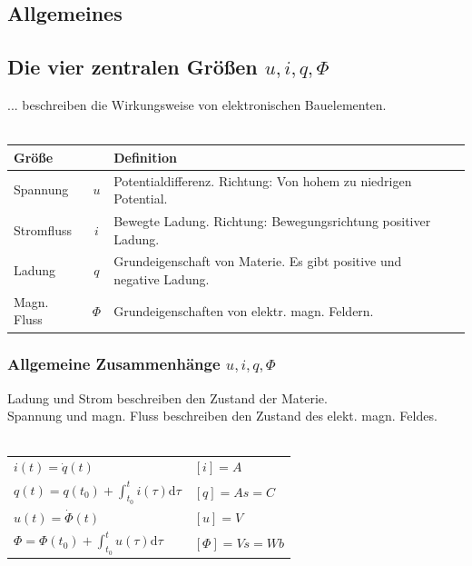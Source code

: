 \documentclass[fs, footer]{latex4ei}
\begin{document}
\begin{multicols*}{4}

\section{Allgemeines}
	
	\subsection{Die vier zentralen Größen $u,i,q,\Phi$}
	... beschreiben die Wirkungsweise von elektronischen Bauelementen.\\ \\
	\begin{tabular}{lc|ll}
		Größe & & Definition\\ \hline
		Spannung & $u$ & Potentialdifferenz. Richtung: Von hohem zu niedrigen Potential.\\
		Stromfluss & $i$ & Bewegte Ladung. Richtung: Bewegungsrichtung positiver Ladung.\\
		Ladung & $q$ & Grundeigenschaft von Materie. Es gibt positive und negative Ladung.\\
		Magn. Fluss & $\Phi$ & Grundeigenschaften von elektr. magn. Feldern.\\
	\end{tabular} 
	
		\subsubsection{Allgemeine Zusammenhänge $u,i,q,\Phi$}
		Ladung und Strom beschreiben den Zustand der Materie.\\
		Spannung und magn. Fluss beschreiben den Zustand des elekt. magn. Feldes.\\ \\
		\begin{tabular}{l|l}
			$i(t) = \dot q(t)$ & $[i]=A$\\
			$q(t) = q(t_0) + \int_{t_0}^t i(\tau) \mathrm d\tau$	& $[q]=As=C$ \\ \hline
			$u(t) = \dot \Phi(t)$ & $[u]=V$\\
			$\Phi = \Phi(t_0) + \int_{t_0}^t u(\tau) \mathrm d\tau$ & $[\Phi]=Vs=Wb$ \\
		\end{tabular}
	




\end{multicols*}
\end{document}
